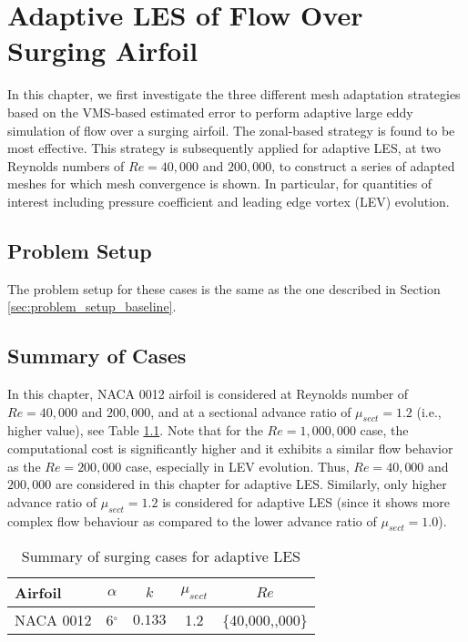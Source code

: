 \chapter{Adaptive LES of Flow Over Surging Airfoil}

In this chapter, we first investigate the three different mesh adaptation strategies based on the VMS-based estimated error to perform adaptive large eddy simulation of flow over a surging airfoil.
The zonal-based strategy is found to be most effective. This strategy is subsequently applied for adaptive LES, at two Reynolds numbers of $Re=40,000$ and $200,000$, to construct a series of adapted meshes for which mesh convergence is shown. In particular, for quantities of interest including pressure coefficient and leading edge vortex (LEV) evolution.

\section{Problem Setup}

The problem setup for these cases is the same as the one described in Section \ref{sec:problem_setup_baseline}.

\section{Summary of Cases}

In this chapter, NACA 0012 airfoil is considered at Reynolds number of $Re=40,000$ and $200,000$, and at a sectional advance ratio of $\mu_{sect}=1.2$ (i.e., higher value), see Table \ref{table:adapt_summary_cases}. Note that for the $Re=1,000,000$ case, the computational cost is significantly higher and it exhibits a similar flow behavior as the $Re=200,000$ case, especially in LEV evolution. Thus, $Re=40,000$ and $200,000$ are considered in this chapter for adaptive LES. Similarly, only higher advance ratio of $\mu_{sect}=1.2$ is considered for adaptive LES (since it shows more complex flow behaviour as compared to the lower advance ratio of $\mu_{sect}=1.0$).

\begin{table}[H]
	\centering
	\caption{Summary of surging cases for adaptive LES}
	\label{table:adapt_summary_cases}
	\begin{tabular}{|l|c|c|c|c|}
		\hline
		Airfoil   & $\alpha$ & $k$ & $\mu_{sect}$ & $Re$ \\
		\hline
		\hline
		NACA 0012 & 6$^\circ$ & $0.133$ &  1.2 & \{40,000,\; 200,000\} \\
	\hline
	\end{tabular}
\end{table}

